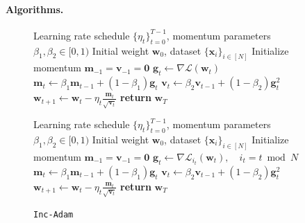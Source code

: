 \documentclass{article} %
\theoremstyle{plain}
\theoremstyle{definition}
\theoremstyle{remark}
\newcommand{\Ls}{\mathcal{L}}
\def\bm{{\mathbf m}}
\def\bx{{\mathbf x}}
\def\bw{{\mathbf w}}
\def\bv{{\mathbf v}}
\def\bg{{\mathbf g}}
\begin{document}
\paragraph{Algorithms.}
\begin{figure}[t]
\vspace{-10pt}
    \centering
    \begin{minipage}{0.49\textwidth}
        \begin{algorithm}[H]
        \caption{\texttt{Det-Adam}}
        \label{alg:det_adam}
        \begin{algorithmic}[1]
        \renewcommand{\algorithmicrequire}{\textbf{Hyperparams:}}
        \renewcommand{\algorithmicensure}{\textbf{Input:}}
        \REQUIRE Learning rate schedule $\{\eta_t\}_{t=0}^{T-1}$, momentum parameters $\beta_1, \beta_2 \in [0, 1)$
        \ENSURE Initial weight $\bw_0$, dataset $\{\bx_i\}_{i\in [N]}$
        \STATE Initialize momentum $\bm_{-1}=\bv_{-1}=\mathbf{0}$
            \STATE $\bg_t \leftarrow \nabla \Ls(\bw_{t})$
            \STATE $\bm_t \leftarrow \beta_1 \bm_{t-1} + (1-\beta_1) \bg_{t}$
            \STATE $\bv_{t} \leftarrow \beta_2 \bv_{t-1} + (1-\beta_2) 
            \bg_{t}^2$
            \STATE $\bw_{t+1} \leftarrow \bw_{t} - \eta_t \frac{\bm_{t}}{\sqrt{\bv_{t}}}$
        \ENDFOR
        \STATE \textbf{return} $\mathbf{w}_T$
        \end{algorithmic}
        \end{algorithm}
    \end{minipage}
    \hfill
    \begin{minipage}{0.49\textwidth}
        \begin{algorithm}[H]
        \caption{\texttt{Inc-Adam}}
        \label{alg:inc_adam}
        \begin{algorithmic}[1]
        \renewcommand{\algorithmicrequire}{\textbf{Hyperparams:}}
        \renewcommand{\algorithmicensure}{\textbf{Input:}}
        \REQUIRE Learning rate schedule $\{\eta_t\}_{t=0}^{T-1}$, momentum parameters $\beta_1, \beta_2 \in [0, 1)$
        \ENSURE Initial weight $\bw_0$, dataset $\{\bx_i\}_{i\in [N]}$
        \STATE Initialize momentum $\bm_{-1}=\bv_{-1}=\mathbf{0}$
            \STATE $\bg_t \leftarrow \nabla \Ls_{i_t}(\bw_{t}),\quad i_t = t \bmod N$
            \STATE $\bm_t \leftarrow \beta_1 \bm_{t-1} + (1-\beta_1) \bg_{t}$
            \STATE $\bv_{t} \leftarrow \beta_2 \bv_{t-1} + (1-\beta_2) 
            \bg_{t}^2$
            \STATE $\bw_{t+1} \leftarrow \bw_{t} - \eta_t \frac{\bm_{t}}{\sqrt{\bv_{t}}}$
        \ENDFOR
        \STATE \textbf{return} $\mathbf{w}_T$
        \end{algorithmic}
        \end{algorithm}
    \end{minipage}
    \vspace{-10pt}
\end{figure}
\end{document}

